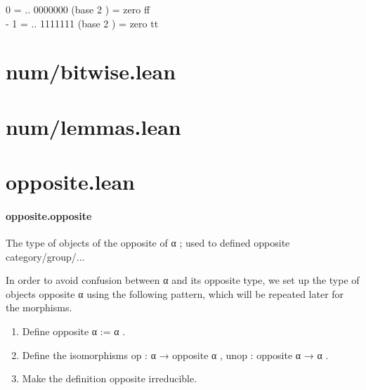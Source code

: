 \documentclass{article}
\begin{document}
\colorbox[RGB]{253,246,227}{\parbox{4.5in}{{{{\color[RGB]{108, 113, 196} 0 }}}{{{\color[RGB]{101, 123, 131}    }}}{{{\color[RGB]{181, 137, 0} = }}}{{{\color[RGB]{101, 123, 131}  .. }}}{{{\color[RGB]{108, 113, 196} 0000000 }}}{{{\color[RGB]{101, 123, 131} (base  }}}{{{\color[RGB]{108, 113, 196} 2 }}}{{{\color[RGB]{101, 123, 131} )  }}}{{{\color[RGB]{181, 137, 0} = }}}{{{\color[RGB]{101, 123, 131}  zero ff
 }}}\\

{{{\color[RGB]{181, 137, 0} - }}}{{{\color[RGB]{108, 113, 196} 1 }}}{{{\color[RGB]{101, 123, 131}   }}}{{{\color[RGB]{181, 137, 0} = }}}{{{\color[RGB]{101, 123, 131}  .. }}}{{{\color[RGB]{108, 113, 196} 1111111 }}}{{{\color[RGB]{101, 123, 131} (base  }}}{{{\color[RGB]{108, 113, 196} 2 }}}{{{\color[RGB]{101, 123, 131} )  }}}{{{\color[RGB]{181, 137, 0} = }}}{{{\color[RGB]{101, 123, 131}  zero tt }}}\\

}}\section{num/bitwise.lean}\section{num/lemmas.lean}\section{opposite.lean}\paragraph{opposite.opposite}
\par
The type of objects of the opposite of 
\colorbox[RGB]{253,246,227}{{{{\color[RGB]{101, 123, 131} α }}}}; used to defined opposite category/group/...
\par
In order to avoid confusion between 
\colorbox[RGB]{253,246,227}{{{{\color[RGB]{101, 123, 131} α }}}} and its opposite type, we
set up the type of objects 
\colorbox[RGB]{253,246,227}{{{{\color[RGB]{101, 123, 131} opposite α }}}} using the following pattern,
which will be repeated later for the morphisms.
\begin{enumerate}[1]
\item Define 
\colorbox[RGB]{253,246,227}{{{{\color[RGB]{101, 123, 131} opposite α  }}}{{{\color[RGB]{181, 137, 0} := }}}{{{\color[RGB]{101, 123, 131}  α }}}}.

\item Define the isomorphisms 
\colorbox[RGB]{253,246,227}{{{{\color[RGB]{101, 123, 131} op : α  }}}{{{\color[RGB]{133, 153, 0} → }}}{{{\color[RGB]{101, 123, 131}  opposite α }}}}, 
\colorbox[RGB]{253,246,227}{{{{\color[RGB]{101, 123, 131} unop : opposite α  }}}{{{\color[RGB]{133, 153, 0} → }}}{{{\color[RGB]{101, 123, 131}  α }}}}.

\item Make the definition 
\colorbox[RGB]{253,246,227}{{{{\color[RGB]{101, 123, 131} opposite }}}} irreducible.

\end{enumerate}\par
\end{document}
